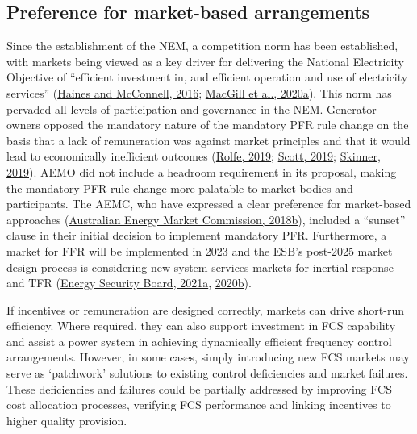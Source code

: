 \documentclass[12pt,a4paper,]{report}
\begin{document}
\hypertarget{preference-for-market-based-arrangements}{%
\subsection{Preference for market-based
arrangements}\label{preference-for-market-based-arrangements}}

Since the establishment of the NEM, a competition norm has been
established, with markets being viewed as a key driver for delivering
the National Electricity Objective of ``efficient investment in, and
efficient operation and use of electricity services''
(\protect\hyperlink{ref-hainesEnvironmentalNormsElectricity2016}{Haines
and McConnell, 2016};
\protect\hyperlink{ref-macgillElectricityMarketNorms2020}{MacGill et
al., 2020a}). This norm has pervaded all levels of participation and
governance in the NEM. Generator owners opposed the mandatory nature of
the mandatory PFR rule change on the basis that a lack of remuneration
was against market principles and that it would lead to economically
inefficient outcomes
(\protect\hyperlink{ref-rolfeMandatoryPrimaryFrequency2019}{Rolfe,
2019}; \protect\hyperlink{ref-scottMandatoryPrimaryFrequency2019}{Scott,
2019};
\protect\hyperlink{ref-skinnerMandatoryPrimaryFrequency2019}{Skinner,
2019}). AEMO did not include a headroom requirement in its proposal,
making the mandatory PFR rule change more palatable to market bodies and
participants. The AEMC, who have expressed a clear preference for
market-based approaches
(\protect\hyperlink{ref-australianenergymarketcommissionFrequencyControlFrameworks2018}{Australian
Energy Market Commission, 2018b}), included a ``sunset'' clause in their
initial decision to implement mandatory PFR. Furthermore, a market for
FFR will be implemented in 2023 and the ESB's post-2025 market design
process is considering new system services markets for inertial response
and TFR
(\protect\hyperlink{ref-energysecurityboardPost2025Market2021}{Energy
Security Board, 2021a},
\protect\hyperlink{ref-energysecurityboardPost2025Market2020}{2020b}).

If incentives or remuneration are designed correctly, markets can drive
short-run efficiency. Where required, they can also support investment
in FCS capability and assist a power system in achieving dynamically
efficient frequency control arrangements. However, in some cases, simply
introducing new FCS markets may serve as `patchwork' solutions to
existing control deficiencies and market failures. These deficiencies
and failures could be partially addressed by improving FCS cost
allocation processes, verifying FCS performance and linking incentives
to higher quality provision.
\end{document}
